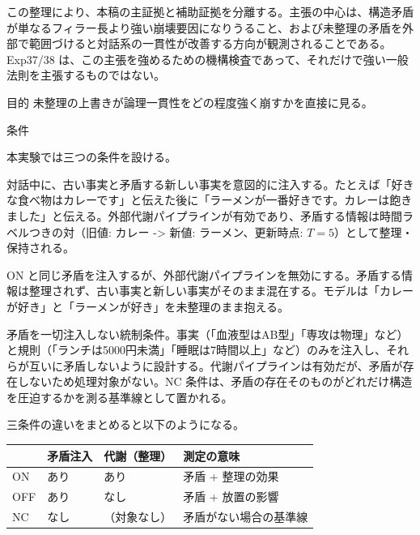 \documentclass[12pt,a4paper]{article}
\begin{document}
この整理により、本稿の主証拠と補助証拠を分離する。主張の中心は、構造矛盾が単なるフィラー長より強い崩壊要因になりうること、および未整理の矛盾を外部で範囲づけると対話系の一貫性が改善する方向が観測されることである。Exp37/38 は、この主張を強めるための機構検査であって、それだけで強い一般法則を主張するものではない。

目的 未整理の上書きが論理一貫性をどの程度強く崩すかを直接に見る。

条件

本実験では三つの条件を設ける。

\begin{definition}
対話中に、古い事実と矛盾する新しい事実を意図的に注入する。たとえば「好きな食べ物はカレーです」と伝えた後に「ラーメンが一番好きです。カレーは飽きました」と伝える。外部代謝パイプラインが有効であり、矛盾する情報は時間ラベルつきの対（旧値: カレー -> 新値: ラーメン、更新時点: $T=5$）として整理・保持される。
\end{definition}

\begin{definition}
ON と同じ矛盾を注入するが、外部代謝パイプラインを無効にする。矛盾する情報は整理されず、古い事実と新しい事実がそのまま混在する。モデルは「カレーが好き」と「ラーメンが好き」を未整理のまま抱える。
\end{definition}

\begin{definition}
矛盾を一切注入しない統制条件。事実（「血液型はAB型」「専攻は物理」など）と規則（「ランチは5000円未満」「睡眠は7時間以上」など）のみを注入し、それらが互いに矛盾しないように設計する。代謝パイプラインは有効だが、矛盾が存在しないため処理対象がない。NC 条件は、矛盾の存在そのものがどれだけ構造を圧迫するかを測る基準線として置かれる。
\end{definition}

三条件の違いをまとめると以下のようになる。

{\def\LTcaptype{table} %
\begin{longtable}[]{@{}llll@{}}
\toprule\noalign{}
& 矛盾注入 & 代謝（整理） & 測定の意味 \\
\midrule\noalign{}
\endhead
\bottomrule\noalign{}
\endlastfoot
ON & あり & あり & 矛盾 + 整理の効果 \\
OFF & あり & なし & 矛盾 + 放置の影響 \\
NC & なし & （対象なし） & 矛盾がない場合の基準線 \\
\end{longtable}
}
\end{document}
